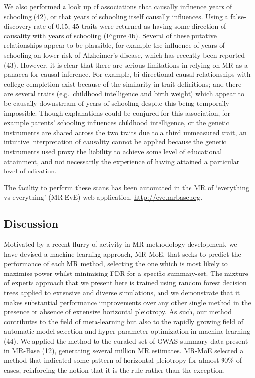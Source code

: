 \documentclass[]{article}
\begin{document}
We also performed a look up of associations that causally influence
years of schooling (42), or that years of schooling itself causally
influences. Using a false-discovery rate of 0.05, 45 traits were
returned as having some direction of causality with years of schooling
(Figure 4b). Several of these putative relationships appear to be
plausible, for example the influence of years of schooling on lower risk
of Alzheimer's disease, which has recently been reported (43). However,
it is clear that there are serious limitations in relying on MR as a
panacea for causal inference. For example, bi-directional causal
relationships with college completion exist because of the similarity in
trait definitions; and there are several traits (e.g.~childhood
intelligence and birth weight) which appear to be causally downstream of
years of schooling despite this being temporally impossible. Though
explanations could be conjured for this association, for example
parents' schooling influences childhood intelligence, or the genetic
instruments are shared across the two traits due to a third unmeasured
trait, an intuitive interpretation of causality cannot be applied
because the genetic instruments used proxy the liability to achieve some
level of educational attainment, and not necessarily the experience of
having attained a particular level of edication.

The facility to perform these scans has been automated in the MR of
`everything vs everything' (MR-EvE) web application,
\url{http://eve.mrbase.org}.

\subsection{Discussion}\label{discussion}

Motivated by a recent flurry of activity in MR methodology development,
we have devised a machine learning approach, MR-MoE, that seeks to
predict the performance of each MR method, selecting the one which is
most likely to maximise power whilst minimising FDR for a specific
summary-set. The mixture of experts approach that we present here is
trained using random forest decision trees applied to extensive and
diverse simulations, and we demonstrate that it makes substantial
performance improvements over any other single method in the presence or
absence of extensive horizontal pleiotropy. As such, our method
contributes to the field of meta-learning but also to the rapidly
growing field of automatic model selection and hyper-parameter
optimization in machine learning (44). We applied the method to the
curated set of GWAS summary data present in MR-Base (12), generating
several million MR estimates. MR-MoE selected a method that indicated
some pattern of horizontal pleiotropy for almost 90\% of cases,
reinforcing the notion that it is the rule rather than the exception.
\end{document}
